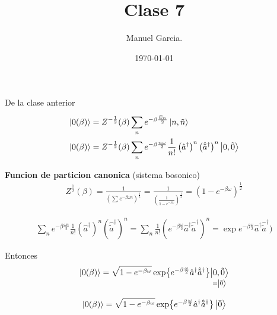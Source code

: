 \documentclass{article}
\title{Clase 7}
\author{Manuel Garcia.}
\date{\today}
\newcommand{\caja}[3]{%
  \begin{tcolorbox}[colback=#1!5!white,colframe=#1!25!black,title=#2]
    #3
  \end{tcolorbox}%
}
\begin{document}
\maketitle

\section{}
De la clase anterior 
\begin{align*}
  \ket{0(\beta)} &= Z ^ {- \frac{1}{2}}(\beta) \displaystyle\sum_{n }^{} e ^ {- \beta \frac{E_n  }{2}} \ket{n, \tilde n }\\
  \ket{0(\beta)} &= Z ^ {- \frac{1}{2}}(\beta) \displaystyle\sum_{n }^{} e ^ {- \beta \frac{n\omega }{2}} \frac{1}{n! } \left(\hat a ^ {\dagger }\right)^n\left(\hat{\tilde a} ^ {\dagger }\right)^n \ket{0, \tilde 0 }
\end{align*}

\textbf{Funcion de particion canonica } (sistema bosonico)
\begin{gather*}
  Z ^ {\frac{1}{2}} (\beta) = \frac{1}{\left(\displaystyle\sum_{}^{}e ^ {- \beta \omega n }\right) ^ {\frac{1}{2}}} = \frac{1}{\left(\frac{1}{1 - e ^ {- \beta \omega}}\right)^ {\frac{1}{2}}} = \left(1 - e ^ {- \beta \omega }\right) ^ {\frac{1}{2}}
\end{gather*}

\hfill 

\hfill 

\begin{gather*}
  \displaystyle\sum_{n }^{} e ^ {- \beta \frac{\omega n }{2 }}\frac{1}{n! } \left(\hat a ^ {\dagger }\right)^n\left(\hat{\tilde a} ^ {\dagger }\right)^n = \displaystyle\sum_{n }^{} \frac{1}{n! } \left(e ^ {- \beta \frac{\omega}{2}} \hat a ^ {\dagger } \hat{\tilde a } ^ {\dagger }\right)^ {n } = \exp{ e ^ {- \beta \frac{\omega }{2}}\hat a ^ {\dagger } \hat{\tilde a } ^ {\dagger })} 
\end{gather*}

Entonces 
\begin{gather*}
  \ket{0 (\beta)} = \sqrt{1 - e ^ {- \beta \omega }}  \exp{e ^ {- \beta \frac{\omega}{2}}\hat a ^ {\dagger } \hat{\tilde a } ^ {\dagger }} \underset{=\ket{\bar 0 }}{\ket{0, \tilde 0}} 
\end{gather*}
\caja{green}{}{
  \begin{gather*}
    \ket{0 (\beta)} = \sqrt{1 - e ^ {- \beta \omega }}  \exp{e ^ {- \beta \frac{\omega}{2}}\hat a ^ {\dagger } \hat{\tilde a } ^ {\dagger }}\ket{\bar 0} 
  \end{gather*}
}
\end{document}
